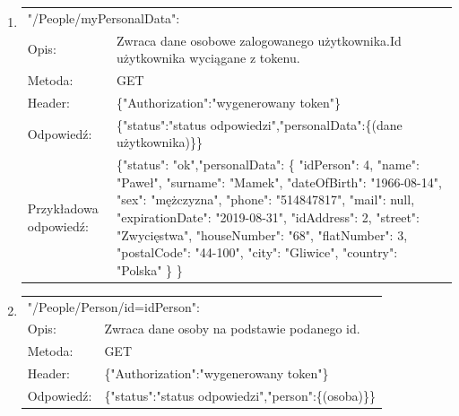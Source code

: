\documentclass[12pt, titlepage]{article}
\begin{document}
\begin{enumerate}
	\item
	{\renewcommand{\arraystretch}{1.5}
	\begin{tabular}[t]{p{3cm} p{15cm}}
	\multicolumn{2}{l}{"/People/myPersonalData":} \\
	Opis: &  Zwraca dane osobowe zalogowanego użytkownika.\newline Id użytkownika wyciągane z tokenu. \\
	Metoda: & GET \\
	Header: & \{"Authorization":"wygenerowany token"\} \\
	Odpowiedź: & \{"status":"status odpowiedzi",\newline "personalData":\{(dane użytkownika)\}\}  \\
	Przykładowa \newline odpowiedź: & \{"status": "ok",\newline "personalData": \{ \newline
        "idPerson": 4,\newline
        "name": "Paweł",\newline
        "surname": "Mamek",\newline
        "dateOfBirth": "1966-08-14",\newline
        "sex": "mężczyzna",\newline
        "phone": "514847817",\newline
        "mail": null,\newline
        "expirationDate": "2019-08-31",\newline
        "idAddress": 2,\newline
        "street": "Zwycięstwa",\newline
        "houseNumber": "68",\newline
        "flatNumber": 3,\newline
        "postalCode": "44-100",\newline
        "city": "Gliwice",\newline
        "country": "Polska"\newline
    \} \}
	\end{tabular}}
	
	\item
	{\renewcommand{\arraystretch}{1.5}
	\begin{tabular}[t]{p{3cm} p{15cm}}
	\multicolumn{2}{l}{"/People/Person/id={idPerson}":} \\
	Opis: & Zwraca dane osoby na podstawie podanego id. \\
	Metoda: & GET \\
	Header: & \{"Authorization":"wygenerowany token"\} \\
	Odpowiedź: & \{"status":"status odpowiedzi",\newline "person":\{(osoba)\}\}
	\end{tabular}}
	

\end{enumerate}
\end{document}
